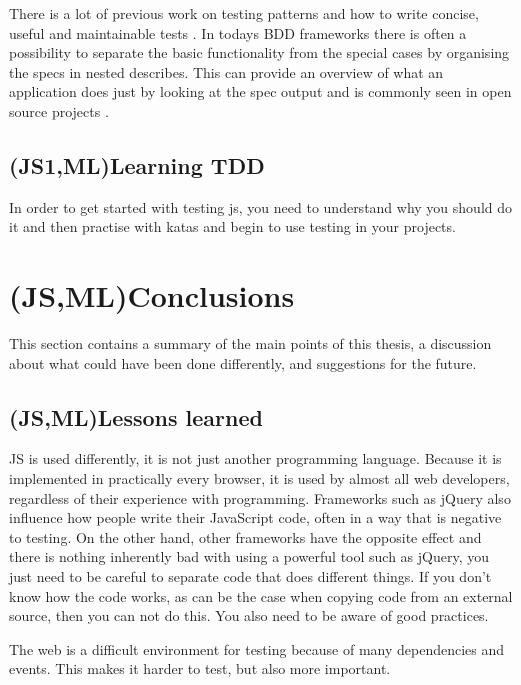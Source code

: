 \documentclass[11pt]{article}
\begin{document}
There is a lot of previous work on testing patterns and how to write concise, useful and maintainable tests \cite[part~III]{TestPatterns}\cite[ch.~3-5]{BDDJS}\cite[p.~461-474]{Tddjs}\cite[p.~86-87]{TestableJS}\cite[p.~13-14]{JasmineBook}. In todays BDD frameworks there is often a possibility to separate the basic functionality from the special cases by organising the \glspl{spec} in nested describes. This can provide an overview of what an application does just by looking at the \gls{spec} output and is commonly seen in open source projects \cite[question~42]{Stenmark}.

\subsection{(JS1,ML)Learning TDD}

In order to get started with testing \gls{js}, you need to understand why you should do it \cite[question~38]{Edelstam} and then practise with katas and begin to use testing in your projects.


\section{(JS,ML)Conclusions}

This section contains a summary of the main points of this thesis, a discussion about what could have been done differently, and suggestions for the future.

\subsection{(JS,ML)Lessons learned}

JS is used differently, it is not just another programming language. Because it is implemented in practically every browser, it is used by almost all web developers, regardless of their experience with programming. Frameworks such as jQuery also influence how people write their JavaScript code, often in a way that is negative to testing. On the other hand, other frameworks have the opposite effect and there is nothing inherently bad with using a powerful tool such as jQuery, you just need to be careful to separate code that does different things. If you don't know how the code works, as can be the case when copying code from an external source, then you can not do this. You also need to be aware of good practices.

The web is a difficult environment for testing because of many dependencies and events. This makes it harder to test, but also more important.
\end{document}
